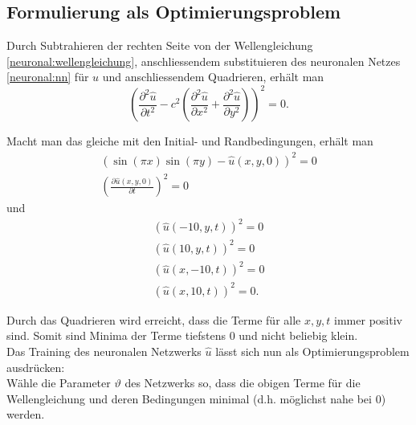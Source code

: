 \subsection{Formulierung als Optimierungsproblem}\label{neuronal:subsection:optimierungsproblem}
Durch Subtrahieren der rechten Seite von der Wellengleichung \eqref{neuronal:wellengleichung}, anschliessendem substituieren des neuronalen Netzes \eqref{neuronal:nn} für \( u \) und anschliessendem Quadrieren, erhält man
\begin{equation}
    \left(\frac{\partial^2 \hat{u}}{\partial t^2} - c^2 \left( \frac{\partial^2 \hat{u}}{\partial x^2} + \frac{\partial^2 \hat{u}}{\partial y^2} \right)\right)^2 = 0.
\end{equation}

Macht man das gleiche mit den Initial- und Randbedingungen, erhält man
\begin{equation}
    \begin{aligned}
        \left(\sin(\pi x) \sin(\pi y) - \hat{u}(x, y, 0)\right)^2 = 0\\
        \left(\frac{\partial \hat{u}(x, y, 0)}{\partial t}\right)^2 = 0
    \end{aligned}
\end{equation}
und
\begin{equation}
    \begin{aligned}
        \left(\hat{u}(-10, y, t)\right)^2 = 0\\
        \left(\hat{u}(10, y, t)\right)^2 = 0\\
        \left(\hat{u}(x, -10, t)\right)^2 = 0\\
        \left(\hat{u}(x, 10, t)\right)^2 = 0.
    \end{aligned}
\end{equation}

Durch das Quadrieren wird erreicht, dass die Terme für alle \( x, y, t \) immer positiv sind.
Somit sind Minima der Terme tiefstens 0 und nicht beliebig klein.\\

Das Training des neuronalen Netzwerks \( \hat{u} \) lässt sich nun als Optimierungsproblem ausdrücken:\\
Wähle die Parameter \( \vartheta \) des Netzwerks so, dass die obigen Terme für die Wellengleichung und deren Bedingungen minimal (d.h. möglichst nahe bei 0) werden.\\

